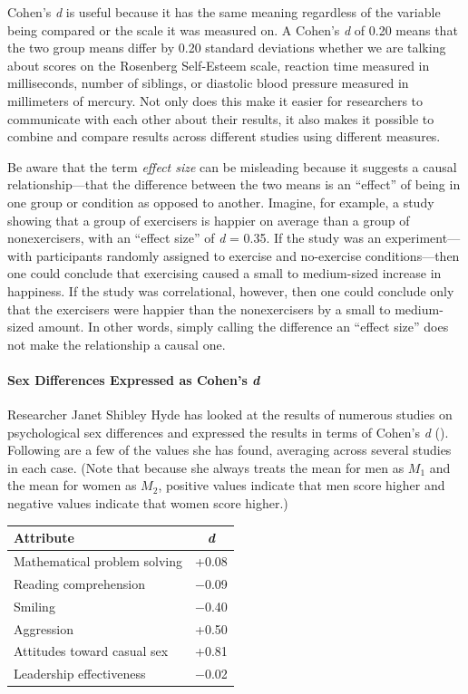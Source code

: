 \documentclass[
]{krantz}
\begin{document}
Cohen's \emph{d} is useful because it has the same meaning regardless of the variable being compared or the scale it was measured on. A Cohen's \emph{d} of 0.20 means that the two group means differ by 0.20 standard deviations whether we are talking about scores on the Rosenberg Self-Esteem scale, reaction time measured in milliseconds, number of siblings, or diastolic blood pressure measured in millimeters of mercury. Not only does this make it easier for researchers to communicate with each other about their results, it also makes it possible to combine and compare results across different studies using different measures.

Be aware that the term \emph{effect size} can be misleading because it suggests a causal relationship---that the difference between the two means is an ``effect'' of being in one group or condition as opposed to another. Imagine, for example, a study showing that a group of exercisers is happier on average than a group of nonexercisers, with an ``effect size'' of \emph{d} = 0.35. If the study was an experiment---with participants randomly assigned to exercise and no-exercise conditions---then one could conclude that exercising caused a small to medium-sized increase in happiness. If the study was correlational, however, then one could conclude only that the exercisers were happier than the nonexercisers by a small to medium-sized amount. In other words, simply calling the difference an ``effect size'' does not make the relationship a causal one.

\paragraph*{\texorpdfstring{Sex Differences Expressed as Cohen's \emph{d}}{Sex Differences Expressed as Cohen's d}}\label{sex-differences-expressed-as-cohens-d}

Researcher Janet Shibley Hyde has looked at the results of numerous studies on psychological sex differences and expressed the results in terms of Cohen's \emph{d} (). Following are a few of the values she has found, averaging across several studies in each case. (Note that because she always treats the mean for men as \(M_1\) and the mean for women as \(M_2\), positive values indicate that men score higher and negative values indicate that women score higher.)

\begin{longtable}[]{@{}lc@{}}
\toprule\noalign{}
Attribute & \emph{d} \\
\midrule\noalign{}
\endhead
\bottomrule\noalign{}
\endlastfoot
Mathematical problem solving & +0.08 \\
Reading comprehension & −0.09 \\
Smiling & −0.40 \\
Aggression & +0.50 \\
Attitudes toward casual sex & +0.81 \\
Leadership effectiveness & −0.02 \\
\end{longtable}
\end{document}
